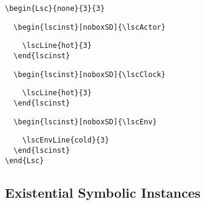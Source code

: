 \documentclass{article}
\begin{document}
\begin{center}%
\begin{minipage}{0.4\textwidth}
\end{minipage}
\hfill
\begin{minipage}{0.525\textwidth}%
\small%
{\gray\begin{verbatim}
\begin{Lsc}{none}{3}{3}
\end{verbatim}}%
\verbunskip%
{\begin{verbatim}
  \begin{lscinst}[noboxSD]{\lscActor}
\end{verbatim}}%
\verbunskip%
{\gray\begin{verbatim}
    \lscLine{hot}{3}
  \end{lscinst}
\end{verbatim}}%
\verbunskip%
{\begin{verbatim}
  \begin{lscinst}[noboxSD]{\lscClock}
\end{verbatim}}%
\verbunskip%
{\gray\begin{verbatim}
    \lscLine{hot}{3}
  \end{lscinst}
\end{verbatim}}%
\verbunskip%
{\begin{verbatim}
  \begin{lscinst}[noboxSD]{\lscEnv}
\end{verbatim}}%
\verbunskip%
{\gray\begin{verbatim}
    \lscEnvLine{cold}{3}
  \end{lscinst}
\end{Lsc}
\end{verbatim}}%
\end{minipage}
\end{center}%

\subsection{Existential Symbolic Instances}
\label{sec:pipo:inst}
\end{document}
